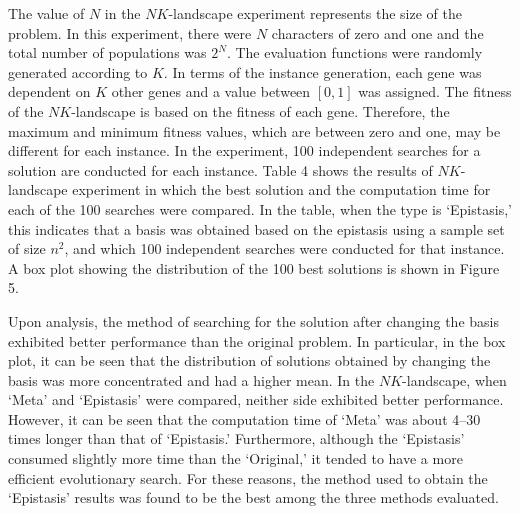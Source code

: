 The value of $ N $ in the $ NK $-landscape experiment represents the size of the problem. In this experiment, there were $ N $ characters of zero and one and the total number of populations was $ 2^N $. The evaluation functions were randomly generated according to $ K $. In terms of the instance generation, each gene was dependent on $ K $ other genes and a value between $ \left[0,1\right] $ was assigned. The fitness of the $ NK $-landscape is based on the fitness of each gene. Therefore, the maximum and minimum fitness values, which are between zero and one, may be different for each instance. In the experiment, 100 independent searches for a solution are conducted for each instance. Table 4 shows the results of $ NK $-landscape experiment in which the best solution and the computation time for each of the 100 searches were compared. In the table, when the type is `Epistasis,' this indicates that a basis was obtained based on the epistasis using a sample set of size $ n^2 $, and which 100 independent searches were conducted for that instance. A box plot showing the distribution of the 100 best solutions is shown in Figure 5.

Upon analysis, the method of searching for the solution after changing the basis exhibited better performance than the original problem. In particular, in the box plot, it can be seen that the distribution of solutions obtained by changing the basis was more concentrated and had a higher mean. In the $ NK $-landscape, when `Meta' and `Epistasis' were compared, neither side exhibited better performance. However, it can be seen that the computation time of ‘Meta’ was about 4–30 times longer than that of `Epistasis.' Furthermore, although the `Epistasis' consumed slightly more time than the `Original,' it tended to have a more efficient evolutionary search. For these reasons, the method used to obtain the `Epistasis' results was found to be the best among the three methods evaluated.


